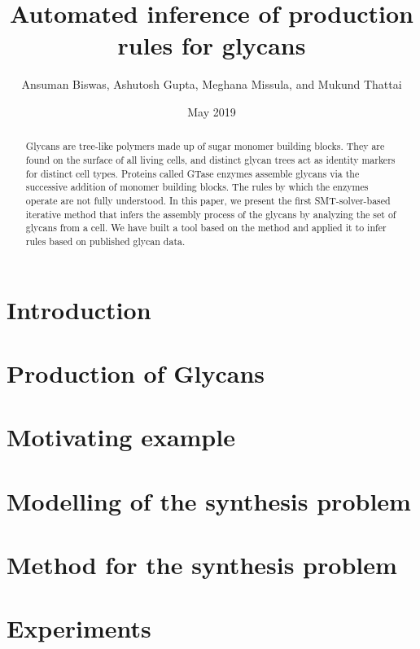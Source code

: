 \documentclass{llncs}
\title{Automated inference of production rules for glycans}
\author{Ansuman Biswas, Ashutosh Gupta, Meghana Missula, and Mukund Thattai}
\date{May 2019}
\begin{document}
\maketitle

\begin{abstract}
  Glycans are tree-like polymers made up of sugar monomer building blocks. They are found on the surface of all living cells, and distinct glycan trees act as identity markers for distinct cell types. Proteins called GTase enzymes assemble glycans via the successive addition of monomer building blocks. The rules by which the enzymes operate are not fully understood. In this paper, we present the first SMT-solver-based iterative method that infers the assembly process of the glycans by analyzing the set of glycans from a cell. We have built a tool based on the method and applied it to infer rules based on published glycan data.
\end{abstract}


\section{Introduction}
\label{sec:intro}


\section{Production of Glycans}
\label{sec:bio}



\section{Motivating example}
\label{sec:motivation}


\section{Modelling of the synthesis problem}
\label{sec:model}



\section{Method for the synthesis problem}
\label{sec:algo}



\section{Experiments}
\label{sec:experiments}

\end{document}
